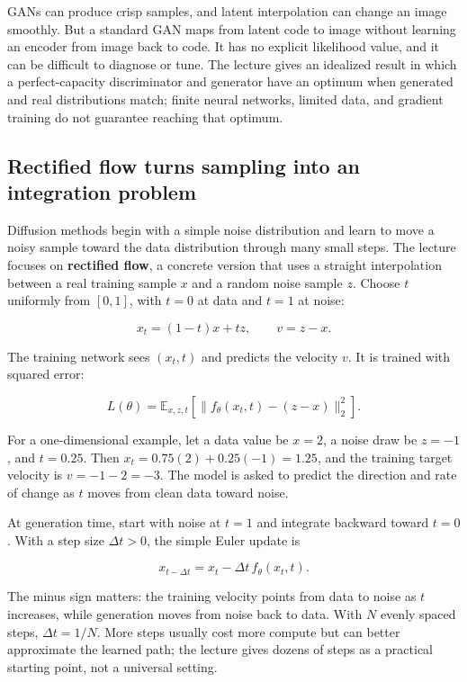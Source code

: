 GANs can produce crisp samples, and latent interpolation can change an image smoothly. But a standard GAN maps from latent code to image without learning an encoder from image back to code. It has no explicit likelihood value, and it can be difficult to diagnose or tune. The lecture gives an idealized result in which a perfect-capacity discriminator and generator have an optimum when generated and real distributions match; finite neural networks, limited data, and gradient training do not guarantee reaching that optimum.

\subsection{Rectified flow turns sampling into an integration problem}\label{04-visual-computing-ii-ch031-rectified-flow-turns-sampling-into-an-integration-problem}

\hypertarget{04-visual-computing-ii-ch031-rectified-flow-turns-sampling-into-an-integration-problem}{}

Diffusion methods begin with a simple noise distribution and learn to move a noisy sample toward the data distribution through many small steps. The lecture focuses on \textbf{rectified flow}, a concrete version that uses a straight interpolation between a real training sample \(x\) and a random noise sample \(z\). Choose \(t\) uniformly from \([0,1]\), with \(t=0\) at data and \(t=1\) at noise:

\[
x_t=(1-t)x+t z,\qquad v=z-x.
\]

The training network sees \((x_t,t)\) and predicts the velocity \(v\). It is trained with squared error:

\[
L(\theta)=\mathbb{E}_{x,z,t}\left[\|f_\theta(x_t,t)-(z-x)\|_2^2\right].
\]

For a one-dimensional example, let a data value be \(x=2\), a noise draw be \(z=-1\), and \(t=0.25\). Then \(x_t=0.75(2)+0.25(-1)=1.25\), and the training target velocity is \(v=-1-2=-3\). The model is asked to predict the direction and rate of change as \(t\) moves from clean data toward noise.

At generation time, start with noise at \(t=1\) and integrate backward toward \(t=0\). With a step size \(\Delta t>0\), the simple Euler update is

\[
x_{t-\Delta t}=x_t-\Delta t\,f_\theta(x_t,t).
\]

The minus sign matters: the training velocity points from data to noise as \(t\) increases, while generation moves from noise back to data. With \(N\) evenly spaced steps, \(\Delta t=1/N\). More steps usually cost more compute but can better approximate the learned path; the lecture gives dozens of steps as a practical starting point, not a universal setting.

